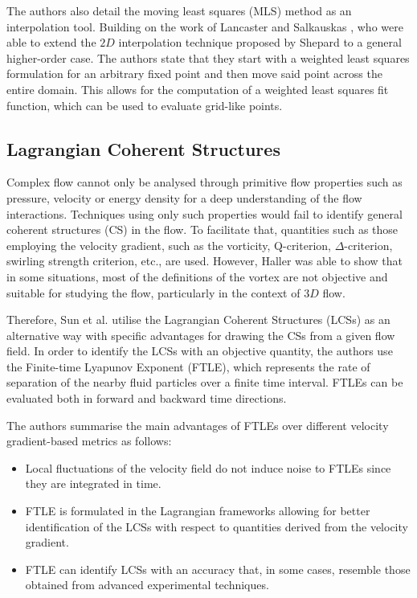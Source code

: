 The authors also detail the moving least squares (MLS) method as an interpolation tool. Building on the work of Lancaster and Salkauskas \parencite{lancaster1981surfaces}, who were able to extend the $2D$ interpolation technique proposed by Shepard \parencite{shepard1968two} to a general higher-order case. The authors state that they start with a weighted least squares formulation for an arbitrary fixed point and then move said point across the entire domain. This allows for the computation of a weighted least squares fit function, which can be used to evaluate grid-like points.

\subsection{Lagrangian Coherent Structures}
Complex flow cannot only be analysed through primitive flow properties such as pressure, velocity or energy density for a deep understanding of the flow interactions. Techniques using only such properties would fail to identify general coherent structures (CS) in the flow. To facilitate that, quantities such as those employing the velocity gradient, such as the vorticity, Q-criterion, $\Delta$-criterion, swirling strength criterion, etc., are used. 
However, Haller \parencite{haller2005objective} was able to show that in some situations, most of the definitions of the vortex are not objective and suitable for studying the flow, particularly in the context of $3D$ flow.

Therefore, Sun et al. \parencite{sun2016detection} utilise the Lagrangian Coherent Structures (LCSs) as an alternative way with specific advantages for drawing the CSs from a given flow field. In order to identify the LCSs with an objective quantity, the authors use the Finite-time Lyapunov Exponent (FTLE), which represents the rate of separation of the nearby fluid particles over a finite time interval. FTLEs can be evaluated both in forward and backward time directions.

The authors summarise the main advantages of FTLEs over different velocity gradient-based metrics as follows:
\begin{itemize}
    \item Local fluctuations of the velocity field do not induce noise to FTLEs since they are integrated in time.
    
    \item FTLE is formulated in the Lagrangian frameworks allowing for better identification of the LCSs with respect to quantities derived from the velocity gradient.
    
    \item FTLE can identify LCSs with an accuracy that, in some cases, resemble those obtained from advanced experimental techniques.
\end{itemize}

